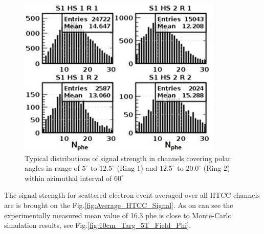 \begin{figure}[!ht]
    \centering
    \includegraphics[width=1.0\linewidth,trim={0.0cm 0.0cm 0.0cm 0.0cm},clip]{images/Signal_S1_HS1_HS2_R1_R2.jpg}
    \caption{Typical distributions of signal strength in channels covering polar angles in range of $5^\circ$ to $12.5^\circ$ (Ring 1) and $12.5^\circ$ to $20.0^\circ$ (Ring 2) within azimuthal interval of $60^\circ$}
    \label{fig:Signal_S1_HS1_HS2_R1_R2}
\end{figure}
The signal strength for scattered electron event averaged over all HTCC channels are is brought on the Fig.\ref{fig:Average_HTCC_Signal}. As on can see the experimentally measured mean value of 16.3 phe is close to Monte-Carlo simulation results, see Fig.\ref{fig:10cm_Targ_5T_Field_Phi}.

